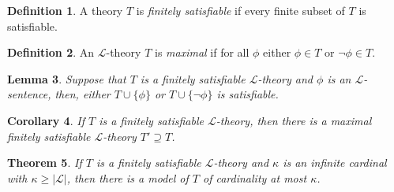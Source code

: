 \documentclass{amsart}
\newtheorem{theorem}{Theorem}[subsection]
\newtheorem{lemma}[theorem]{Lemma}
\newtheorem{corollary}[theorem]{Corollary}
\theoremstyle{definition}
\newtheorem{definition}[theorem]{Definition}
\numberwithin{equation}{section}
\begin{document}
\begin{definition}
    A theory $T$ is \emph{finitely satisfiable} if every finite subset of $T$ is satisfiable.
\end{definition}


\begin{definition}
    An $\mathcal{L}$-theory $T$ is \emph{maximal} if for all $\phi$ either $\phi \in T$ or $\neg \phi \in T$. 
\end{definition}



\begin{lemma}
    Suppose that $T$ is a finitely satisfiable $\mathcal{L}$-theory and $\phi$ is an $\mathcal{L}$-sentence, then,
    either $T \cup \{\phi\}$ or $T \cup \{\neg\phi\}$ is satisfiable.
\end{lemma}

\begin{corollary}
    If $T$ is a finitely satisfiable $\mathcal{L}$-theory,
    then there is a maximal finitely satisfiable $\mathcal{L}$-theory $T' \supseteq T$.
\end{corollary}

\begin{theorem}
    If $T$ is a finitely satisfiable $\mathcal{L}$-theory and $\kappa$ is an infinite cardinal with $\kappa \ge |\mathcal{L}|$,
    then there is a model of $T$ of cardinality at most $\kappa$. 
\end{theorem}
\end{document}
